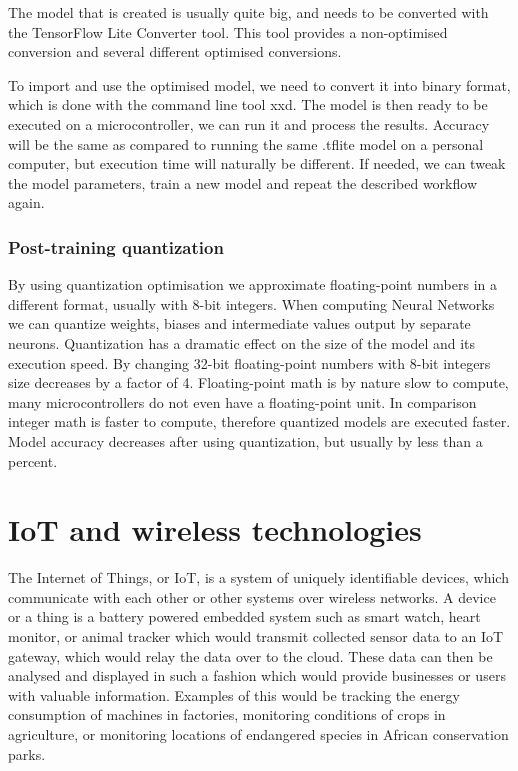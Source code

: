 The model that is created is usually quite big, and needs to be converted with the TensorFlow Lite Converter tool.
This tool provides a non-optimised conversion and several different optimised conversions.

To import and use the optimised model, we need to convert it into binary format, which is done with the command line tool xxd.
The model is then ready to be executed on a microcontroller, we can run it and process the results.
Accuracy will be the same as compared to running the same .tflite model on a personal computer, but execution time will naturally be different.
If needed, we can tweak the model parameters, train a new model and repeat the described workflow again.


\subsubsection{ Post-training quantization}

By using quantization optimisation we approximate floating-point numbers in a different format, usually with 8-bit integers.
When computing Neural Networks we can quantize weights, biases and intermediate values output by separate neurons. 
Quantization has a dramatic effect on the size of the model and its execution speed.
By changing 32-bit floating-point numbers with 8-bit integers size decreases by a factor of 4.
Floating-point math is by nature slow to compute, many microcontrollers do not even have a floating-point unit.
In comparison integer math is faster to compute, therefore quantized models are executed faster.
Model accuracy decreases after using quantization, but usually by less than a percent.
 

\section{ IoT and wireless technologies}

The Internet of Things, or IoT, is a system of uniquely identifiable devices, which communicate with each other or other systems over wireless networks\cite{IoT}.
A device or a thing is a battery powered embedded system such as smart watch, heart monitor, or animal tracker which would transmit collected sensor data to an IoT gateway, which would relay the data over to the cloud.
These data can then be analysed and displayed in such a fashion which would provide businesses or users with valuable information.
Examples of this would be tracking the energy consumption of machines in factories, monitoring conditions of crops in agriculture, or monitoring locations of endangered species in African conservation parks.


